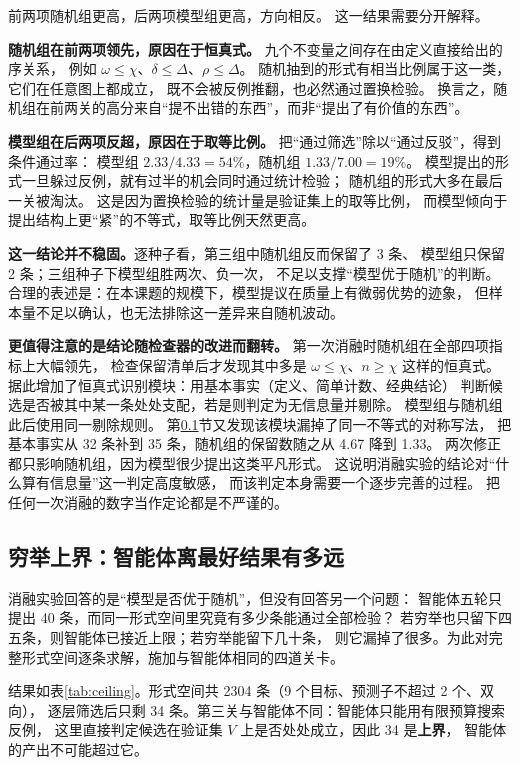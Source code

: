 前两项随机组更高，后两项模型组更高，方向相反。
这一结果需要分开解释。

\textbf{随机组在前两项领先，原因在于恒真式。}
九个不变量之间存在由定义直接给出的序关系，
例如 $\omega \leq \chi$、$\delta \leq \Delta$、$\rho \leq \Delta$。
随机抽到的形式有相当比例属于这一类，它们在任意图上都成立，
既不会被反例推翻，也必然通过置换检验。
换言之，随机组在前两关的高分来自“提不出错的东西”，而非“提出了有价值的东西”。

\textbf{模型组在后两项反超，原因在于取等比例。}
把“通过筛选”除以“通过反驳”，得到条件通过率：
模型组 $2.33/4.33 = 54\%$，随机组 $1.33/7.00 = 19\%$。
模型提出的形式一旦躲过反例，就有过半的机会同时通过统计检验；
随机组的形式大多在最后一关被淘汰。
这是因为置换检验的统计量是验证集上的取等比例，
而模型倾向于提出结构上更“紧”的不等式，取等比例天然更高。

\textbf{这一结论并不稳固。}逐种子看，第三组中随机组反而保留了 3 条、
模型组只保留 2 条；三组种子下模型组胜两次、负一次，
不足以支撑“模型优于随机”的判断。
合理的表述是：在本课题的规模下，模型提议在质量上有微弱优势的迹象，
但样本量不足以确认，也无法排除这一差异来自随机波动。

\textbf{更值得注意的是结论随检查器的改进而翻转。}
第一次消融时随机组在全部四项指标上大幅领先，
检查保留清单后才发现其中多是 $\omega \leq \chi$、$n \geq \chi$ 这样的恒真式。
据此增加了恒真式识别模块：用基本事实（定义、简单计数、经典结论）
判断候选是否被其中某一条处处支配，若是则判定为无信息量并剔除。
模型组与随机组此后使用同一剔除规则。
第\ref{sec:ceiling}节又发现该模块漏掉了同一不等式的对称写法，
把基本事实从 32 条补到 35 条，随机组的保留数随之从 4.67 降到 1.33。
两次修正都只影响随机组，因为模型很少提出这类平凡形式。
这说明消融实验的结论对“什么算有信息量”这一判定高度敏感，
而该判定本身需要一个逐步完善的过程。
把任何一次消融的数字当作定论都是不严谨的。

\subsection{穷举上界：智能体离最好结果有多远}
\label{sec:ceiling}

消融实验回答的是“模型是否优于随机”，但没有回答另一个问题：
智能体五轮只提出 40 条，而同一形式空间里究竟有多少条能通过全部检验？
若穷举也只留下四五条，则智能体已接近上限；若穷举能留下几十条，
则它漏掉了很多。为此对完整形式空间逐条求解，施加与智能体相同的四道关卡。

结果如表\ref{tab:ceiling}。形式空间共 2304 条（9 个目标、预测子不超过 2 个、双向），
逐层筛选后只剩 34 条。第三关与智能体不同：智能体只能用有限预算搜索反例，
这里直接判定候选在验证集 $V$ 上是否处处成立，因此 34 是\textbf{上界}，
智能体的产出不可能超过它。

